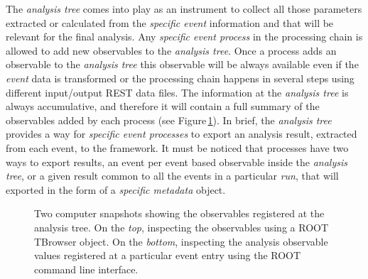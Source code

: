 The \emph{analysis tree} comes into play as an instrument to collect all those parameters extracted or calculated from the \emph{specific event} information and that will be relevant for the final analysis.  Any \emph{specific event process} in the processing chain is allowed to add new observables to the \emph{analysis tree}. Once a process adds an observable to the \emph{analysis tree} this observable will be always available even if the \emph{event} data is transformed or the processing chain happens in several steps using different input/output REST data files. The information at the \emph{analysis tree} is always accumulative, and therefore it will contain a full summary of the observables added by each process (see Figure\,\ref{fig:observables}).
In brief, the \emph{analysis tree} provides a way for \emph{specific event processes} to export an analysis result, extracted from each event, to the framework. It must be noticed that processes have two ways to export results, an event per event based observable inside the \emph{analysis tree}, or a given result common to all the events in a particular \emph{run}, that will exported in the form of a \emph{specific metadata} object.

\begin{figure}[h]
  \centering
	\caption{Two computer snapshots showing the observables registered at the analysis tree. On the \emph{top}, inspecting the observables using a ROOT TBrowser object. On the \emph{bottom}, inspecting the analysis observable values registered at a particular event entry using the ROOT command line interface.}\label{fig:observables}
\end{figure}


